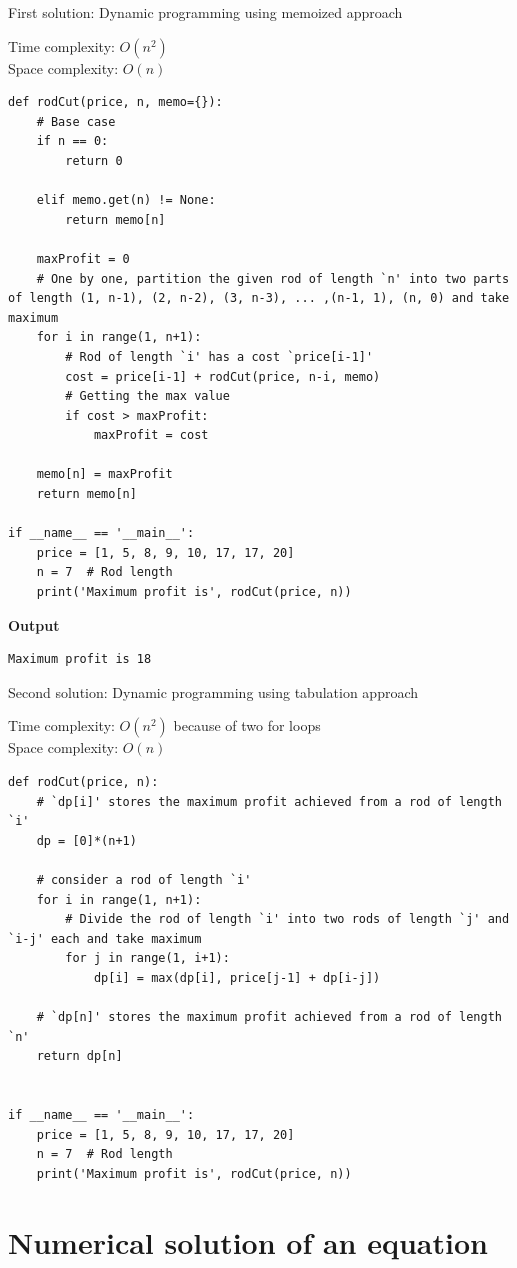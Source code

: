 \documentclass[a4paper,11pt]{book}
\begin{document}
\noindent First solution: Dynamic programming using memoized approach

\noindent Time complexity: $O(n^2)$\\
\noindent  Space complexity: $O(n)$
\begin{lstlisting}
def rodCut(price, n, memo={}):
    # Base case
    if n == 0:
        return 0

    elif memo.get(n) != None:
        return memo[n]
 
    maxProfit = 0
    # One by one, partition the given rod of length `n' into two parts of length (1, n-1), (2, n-2), (3, n-3), ... ,(n-1, 1), (n, 0) and take maximum
    for i in range(1, n+1):
        # Rod of length `i' has a cost `price[i-1]'
        cost = price[i-1] + rodCut(price, n-i, memo)
        # Getting the max value
        if cost > maxProfit:
            maxProfit = cost

    memo[n] = maxProfit
    return memo[n]
 
if __name__ == '__main__':
    price = [1, 5, 8, 9, 10, 17, 17, 20]
    n = 7  # Rod length
    print('Maximum profit is', rodCut(price, n))
\end{lstlisting}
\textbf{Output}
\begin{lstlisting}
Maximum profit is 18
\end{lstlisting}

\noindent Second solution: Dynamic programming using tabulation approach

\noindent Time complexity: $O(n^2)$ because of two for loops\\
\noindent  Space complexity: $O(n)$
\begin{lstlisting}
def rodCut(price, n):
    # `dp[i]' stores the maximum profit achieved from a rod of length `i'
    dp = [0]*(n+1)
 
    # consider a rod of length `i'
    for i in range(1, n+1):
        # Divide the rod of length `i' into two rods of length `j' and `i-j' each and take maximum
        for j in range(1, i+1):
            dp[i] = max(dp[i], price[j-1] + dp[i-j])
 
    # `dp[n]' stores the maximum profit achieved from a rod of length `n'
    return dp[n]

 
if __name__ == '__main__':
    price = [1, 5, 8, 9, 10, 17, 17, 20]
    n = 7  # Rod length
    print('Maximum profit is', rodCut(price, n))
\end{lstlisting}

\newpage\section{Numerical solution of an equation}
\end{document}

